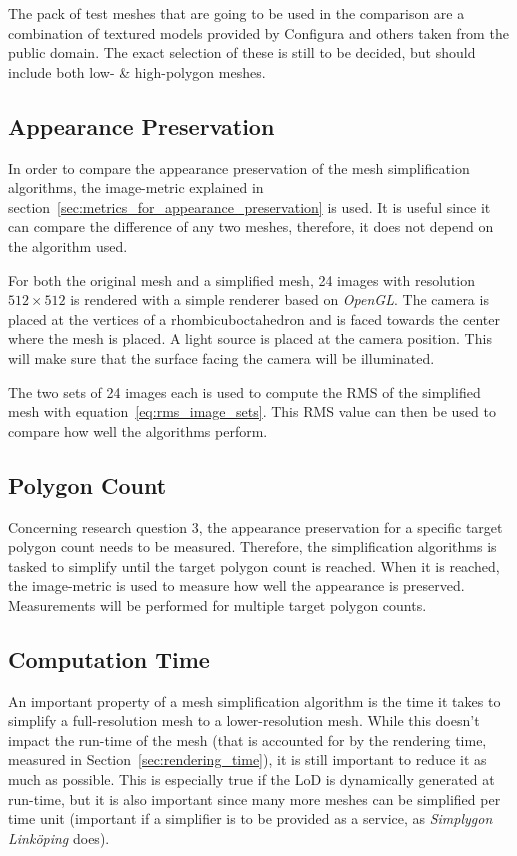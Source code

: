 The pack of test meshes that are going to be used in the comparison are a combination of textured models provided by Configura and others taken from the public domain. The exact selection of these is still to be decided, but should include both low- \& high-polygon meshes.
\fi

\iffalse
\subsection{Appearance Preservation} \label{sec:appearance_preservation}
In order to compare the appearance preservation of the mesh simplification algorithms, the image-metric explained in section~\ref{sec:metrics_for_appearance_preservation} is used. It is useful since it can compare the difference of any two meshes, therefore, it does not depend on the algorithm used.

For both the original mesh and a simplified mesh, 24 images with resolution $512 \times 512$ is rendered with a simple renderer based on \emph{OpenGL}. The camera is placed at the vertices of a rhombicuboctahedron and is faced towards the center where the mesh is placed. A light source is placed at the camera position. This will make sure that the surface facing the camera will be illuminated.

The two sets of 24 images each is used to compute the RMS of the simplified mesh with equation~\ref{eq:rms_image_sets}. This RMS value can then be used to compare how well the algorithms perform. 
\subsection{Polygon Count} \label{sec:polygon_count}
Concerning research question 3, the appearance preservation for a specific target polygon count needs to be measured. Therefore, the simplification algorithms is tasked to simplify until the target polygon count is reached. When it is reached, the image-metric is used to measure how well the appearance is preserved. Measurements will be performed for multiple target polygon counts. 

\subsection{Computation Time} \label{sec:computation_time}

An important property of a mesh simplification algorithm is the time it takes to simplify a full-resolution mesh to a lower-resolution mesh. While this doesn't impact the run-time of the mesh (that is accounted for by the rendering time, measured in Section~\ref{sec:rendering_time}), it is still important to reduce it as much as possible. This is especially true if the LoD is dynamically generated at run-time, but it is also important since many more meshes can be simplified per time unit (important if a simplifier is to be provided as a service, as \emph{Simplygon Linköping} does).

